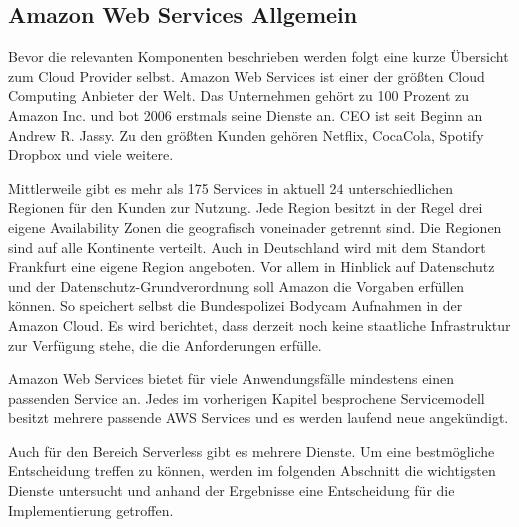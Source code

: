 \subsection{Amazon Web Services Allgemein}

Bevor die relevanten Komponenten beschrieben werden folgt eine kurze Übersicht zum Cloud Provider selbst.
Amazon Web Services ist einer der größten Cloud Computing Anbieter der Welt. Das Unternehmen gehört zu 100 Prozent zu Amazon Inc.
und bot 2006 erstmals seine Dienste an. CEO ist seit Beginn an Andrew R. Jassy.
Zu den größten Kunden gehören Netflix, CocaCola, Spotify Dropbox und viele weitere. \cite[]{AWSAllgemein}

Mittlerweile gibt es mehr als 175 Services in aktuell 24 unterschiedlichen Regionen für den Kunden zur Nutzung. Jede Region besitzt
in der Regel drei eigene Availability Zonen die geografisch voneinader getrennt sind. Die Regionen sind auf alle Kontinente verteilt.
Auch in Deutschland wird mit dem Standort Frankfurt eine eigene Region angeboten. Vor allem in Hinblick auf Datenschutz und
der Datenschutz-Grundverordnung soll Amazon die Vorgaben erfüllen können.
So speichert selbst die Bundespolizei Bodycam Aufnahmen in der Amazon Cloud.\cite[]{AWSPolizei}
Es wird berichtet, {}\glqq dass derzeit noch keine staatliche Infrastruktur zur Verfügung stehe, die die Anforderungen erfülle.\grqq{}
\cite[Abschnitt 1]{AWSPolizei}

Amazon Web Services bietet für viele Anwendungsfälle mindestens einen passenden Service an. Jedes im vorherigen Kapitel besprochene
Servicemodell besitzt mehrere passende AWS Services und es werden laufend neue angekündigt.

Auch für den Bereich Serverless gibt es mehrere Dienste. Um eine bestmögliche Entscheidung treffen zu können, werden im folgenden
Abschnitt die wichtigsten Dienste untersucht und anhand der Ergebnisse eine Entscheidung für die Implementierung getroffen.




